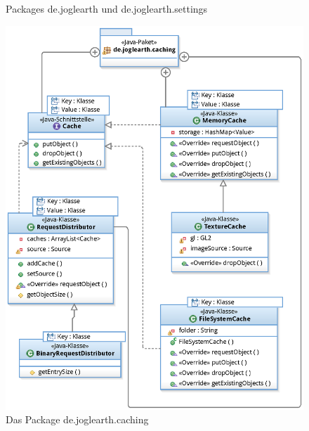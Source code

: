 \documentclass[10pt]{scrreprt}
\begin{document}
\begin{figure}[!htb]
\begin{minipage}[c]{6cm}
        \end{minipage}
        \caption{Packages de.joglearth und de.joglearth.settings}
\end{figure}

\vspace{2mm}

\begin{figure}[!htb]
\begin{center}
	\includegraphics[scale=0.55]{de_joglearth_caching.eps}
\end{center}
\caption{Das Package de.joglearth.caching}
\end{figure}
\end{document}
